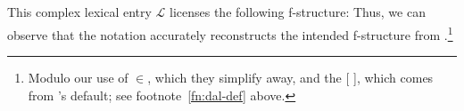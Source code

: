 \documentclass[output=paper,hidelinks]{langscibook}
\begin{document}
\z
%
This complex lexical entry
$\mathcal{L}$\textsubscript{} licenses the
following f-structure:
%
%
Thus, we can observe that the \citet{dalrymple15} notation accurately
reconstructs the intended f-structure from
\citet[178,~(36)]{sadler-nordlinger2004}.\footnote{Modulo our use of $\in$, which
they simplify away, and the [ ], which comes from
\citeauthor{dalrymple15}'s default; see footnote~\ref{fn:dal-def} above.}
\end{document}
